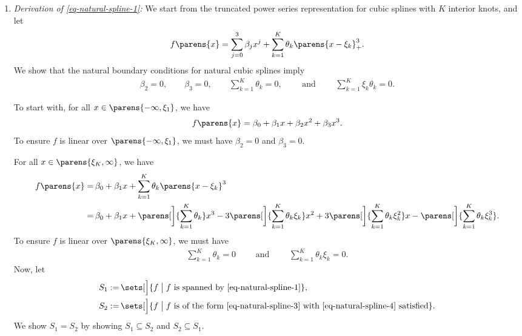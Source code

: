\documentclass[12pt]{article}
\begin{document}
\begin{enumerate}[label=\textbf{\arabic*.}]
\begin{enumerate}
		\item \textit{Derivation of \eqref{eq-natural-spline-1}:} We start from the truncated power series representation for cubic splines with $K$ interior knots, and let 
		\begin{align}\label{eq-natural-spline-3}
			f \parens{x} = \sum_{j=0}^3 \beta_j x^j + \sum_{k=1}^K \theta_k \parens{x - \xi_k}_+^3. 
		\end{align}
		We show that the natural boundary conditions for natural cubic splines imply 
		\begin{align}\label{eq-natural-spline-4}
			\beta_2 = 0, \qquad \beta_3 = 0, \qquad \sum_{k=1}^K \theta_k = 0, \qquad \text{ and } \qquad \sum_{k=1}^K \xi_k \theta_k = 0. 
		\end{align}
		
		To start with, for all $x \in \parens{-\infty, \xi_1}$, we have 
		\begin{align*}
			f \parens{x} = \beta_0 + \beta_1 x + \beta_2 x^2 + \beta_3 x^3. 
		\end{align*}
		To ensure $f$ is linear over $\parens{-\infty, \xi_1}$, we must have $\beta_2 = 0$ and $\beta_3 = 0$. 
		
		For all $x \in \parens{\xi_K, \infty}$, we have 
		\begin{align*}
			f \parens{x} = & \, \beta_0 + \beta_1 x + \sum_{k=1}^K \theta_k \parens{x - \xi_k}^3 \\ 
			= & \, \beta_0 + \beta_1 x + \parens[\bigg]{\sum_{k=1}^K \theta_k} x^3 - 3 \parens[\bigg]{\sum_{k=1}^K \theta_k \xi_k} x^2 + 3 \parens[\bigg]{\sum_{k=1}^K \theta_k \xi_k^2} x - \parens[\bigg]{\sum_{k=1}^K \theta_k \xi_k^3}. 
		\end{align*}
		To ensure $f$ is linear over $\parens{\xi_K, \infty}$, we must have 
		\begin{align*}
			\sum_{k=1}^K \theta_k = 0 \qquad \text{ and } \qquad \sum_{k=1}^K \theta_k \xi_k = 0. 
		\end{align*}
		Now, let 
		\begin{align*}
			S_1 := & \, \sets[\Big]{f \bigm| f \text{ is spanned by \eqref{eq-natural-spline-1}} }, \\ 
			S_2 := & \, \sets[\Big]{f \bigm| f \text{ is of the form \eqref{eq-natural-spline-3} with \eqref{eq-natural-spline-4} satisfied} }. 
		\end{align*}
		We show $S_1 = S_2$ by showing $S_1 \subseteq S_2$ and $S_2 \subseteq S_1$. 
		

\end{enumerate}
\end{enumerate}
\end{document}
